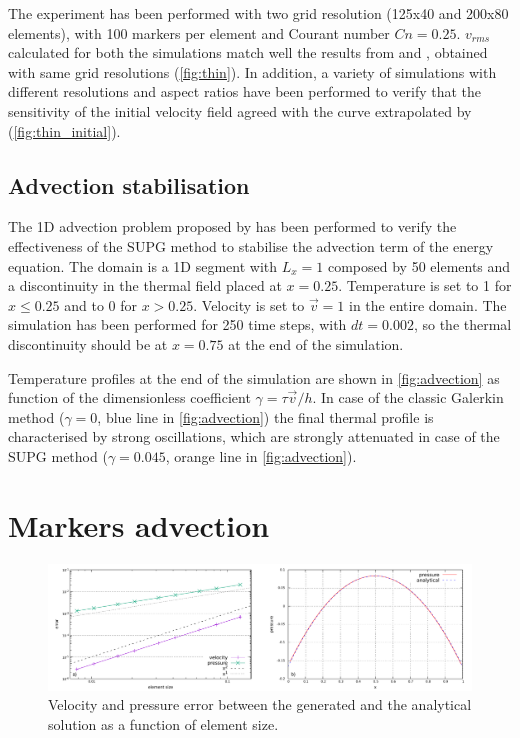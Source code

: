 \documentclass[draft,tec]{agutexSI2019}
\begin{document}
\begin{article}
The experiment has been performed with two grid resolution (125x40 and 200x80 elements), with 100 markers per element and Courant number $Cn=0.25$. $v_{rms}$ calculated for both the simulations match well the results from  and , obtained with same grid resolutions (\ref{fig:thin}). In addition, a variety of simulations with different resolutions and aspect ratios have been performed to verify that the sensitivity of the initial velocity field agreed with the curve extrapolated by  (\ref{fig:thin_initial}).

\subsection{Advection stabilisation}\label{sec:advection}
The 1D advection problem proposed by  has been performed to verify the effectiveness of the SUPG method to stabilise the advection term of the energy equation. The domain is a 1D segment with $L_x=1$ composed by 50 elements and a discontinuity in the thermal field placed at $x=0.25$. Temperature is set to 1 for $x \leq 0.25$ and to 0 for $x > 0.25$. Velocity is set to $\vec{v}=1$ in the entire domain. The simulation has been performed for 250 time steps, with $dt=0.002$, so the thermal discontinuity should be at $x=0.75$ at the end of the simulation.

Temperature profiles at the end of the simulation are shown in \ref{fig:advection} as function of the dimensionless coefficient $\gamma=\tau \vec{v}/h$. In case of the classic Galerkin method ($\gamma=0$, blue line in \ref{fig:advection}) the final thermal profile is characterised by strong oscillations, which are strongly attenuated in case of the SUPG method ($\gamma=0.045$, orange line in \ref{fig:advection}).

\section{Markers advection}\label{sec:markers}


 

\end{article}
\clearpage

\begin{figure}
\noindent\includegraphics[width=\textwidth]{./Figures/errors.pdf}
\caption{Velocity and pressure error between the generated and the analytical solution as a function of element size.}
\label{fig:errors}
\end{figure}
\end{document}
